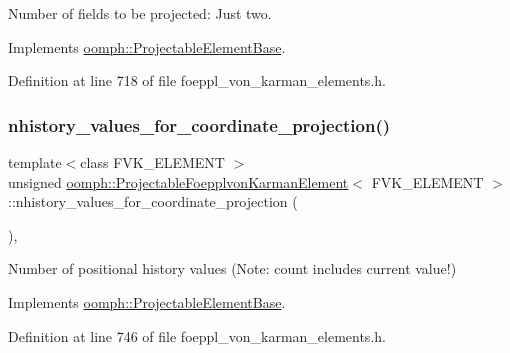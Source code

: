Number of fields to be projected\+: Just two. 



Implements \hyperlink{classoomph_1_1ProjectableElementBase_a44634aa4049332a580d249c25564638c}{oomph\+::\+Projectable\+Element\+Base}.



Definition at line 718 of file foeppl\+\_\+von\+\_\+karman\+\_\+elements.\+h.

\mbox{\label{classoomph_1_1ProjectableFoepplvonKarmanElement_a7b6ce72f267669ecd5fc0119f669772f}} 
\subsubsection{\texorpdfstring{nhistory\+\_\+values\+\_\+for\+\_\+coordinate\+\_\+projection()}{nhistory\_values\_for\_coordinate\_projection()}}
{\footnotesize\ttfamily template$<$class F\+V\+K\+\_\+\+E\+L\+E\+M\+E\+NT $>$ \\
unsigned \hyperlink{classoomph_1_1ProjectableFoepplvonKarmanElement}{oomph\+::\+Projectable\+Foepplvon\+Karman\+Element}$<$ F\+V\+K\+\_\+\+E\+L\+E\+M\+E\+NT $>$\+::nhistory\+\_\+values\+\_\+for\+\_\+coordinate\+\_\+projection (\begin{DoxyParamCaption}{ }\end{DoxyParamCaption})\hspace{0.3cm}{\ttfamily [inline]}, {\ttfamily [virtual]}}



Number of positional history values (Note\+: count includes current value!) 



Implements \hyperlink{classoomph_1_1ProjectableElementBase_ab4ecd0cd24000a3ed675dc7198203c1f}{oomph\+::\+Projectable\+Element\+Base}.



Definition at line 746 of file foeppl\+\_\+von\+\_\+karman\+\_\+elements.\+h.



